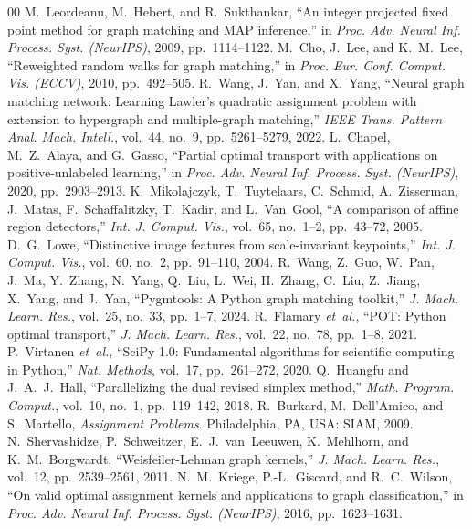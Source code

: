 \documentclass[conference]{IEEEtran}
\begin{document}
\begin{thebibliography}{00}
 M.~Leordeanu, M.~Hebert, and R.~Sukthankar, ``An integer projected fixed point method for graph matching and MAP inference,'' in \textit{Proc. Adv. Neural Inf. Process. Syst. (NeurIPS)}, 2009, pp.~1114--1122.
 M.~Cho, J.~Lee, and K.~M.~Lee, ``Reweighted random walks for graph matching,'' in \textit{Proc. Eur. Conf. Comput. Vis. (ECCV)}, 2010, pp.~492--505.
 R.~Wang, J.~Yan, and X.~Yang, ``Neural graph matching network: Learning Lawler's quadratic assignment problem with extension to hypergraph and multiple-graph matching,'' \textit{IEEE Trans. Pattern Anal. Mach. Intell.}, vol.~44, no.~9, pp.~5261--5279, 2022.
 L.~Chapel, M.~Z.~Alaya, and G.~Gasso, ``Partial optimal transport with applications on positive-unlabeled learning,'' in \textit{Proc. Adv. Neural Inf. Process. Syst. (NeurIPS)}, 2020, pp.~2903--2913.
 K.~Mikolajczyk, T.~Tuytelaars, C.~Schmid, A.~Zisserman, J.~Matas, F.~Schaffalitzky, T.~Kadir, and L.~Van~Gool, ``A comparison of affine region detectors,'' \textit{Int. J. Comput. Vis.}, vol.~65, no.~1--2, pp.~43--72, 2005.
 D.~G.~Lowe, ``Distinctive image features from scale-invariant keypoints,'' \textit{Int. J. Comput. Vis.}, vol.~60, no.~2, pp.~91--110, 2004.
 R.~Wang, Z.~Guo, W.~Pan, J.~Ma, Y.~Zhang, N.~Yang, Q.~Liu, L.~Wei, H.~Zhang, C.~Liu, Z.~Jiang, X.~Yang, and J.~Yan, ``Pygmtools: A Python graph matching toolkit,'' \textit{J. Mach. Learn. Res.}, vol.~25, no.~33, pp.~1--7, 2024.
 R.~Flamary \textit{et~al.}, ``POT: Python optimal transport,'' \textit{J. Mach. Learn. Res.}, vol.~22, no.~78, pp.~1--8, 2021.
 P.~Virtanen \textit{et~al.}, ``SciPy 1.0: Fundamental algorithms for scientific computing in Python,'' \textit{Nat. Methods}, vol.~17, pp.~261--272, 2020.
 Q.~Huangfu and J.~A.~J.~Hall, ``Parallelizing the dual revised simplex method,'' \textit{Math. Program. Comput.}, vol.~10, no.~1, pp.~119--142, 2018.
 R.~Burkard, M.~Dell'Amico, and S.~Martello, \textit{Assignment Problems}. Philadelphia, PA, USA: SIAM, 2009.
 N.~Shervashidze, P.~Schweitzer, E.~J.~van~Leeuwen, K.~Mehlhorn, and K.~M.~Borgwardt, ``Weisfeiler-Lehman graph kernels,'' \textit{J. Mach. Learn. Res.}, vol.~12, pp.~2539--2561, 2011.
 N.~M.~Kriege, P.-L.~Giscard, and R.~C.~Wilson, ``On valid optimal assignment kernels and applications to graph classification,'' in \textit{Proc. Adv. Neural Inf. Process. Syst. (NeurIPS)}, 2016, pp.~1623--1631.

\end{thebibliography}
\end{document}
